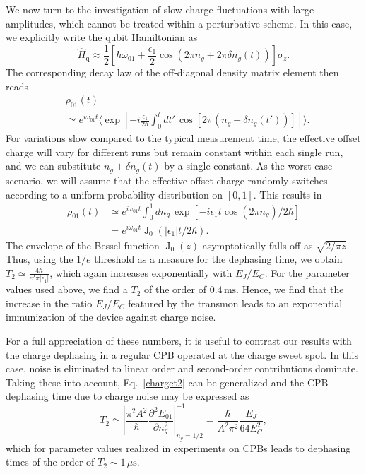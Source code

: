 \documentclass[twocolumn,amsmath,amssymb,floatfix,pra,showpacs,eqsecnum,footinbib,superscriptaddress]{revtex4}
\newcommand{\abs}[1]{\left|#1\right|}
\newcommand{\be}{\begin{equation}}
\newcommand{\ee}{\end{equation}}
\DeclareMathOperator{\bj}{J}
\begin{document}
We now turn to the investigation of slow charge fluctuations with large amplitudes, which cannot be treated within a perturbative scheme. In this case, we explicitly write the qubit Hamiltonian as
\be
\hat{H}_\text{q}\approx \frac{1}{2}\left[\hbar\omega_{01}+\frac{\epsilon_1}{2}\cos(2\pi n_g+ 2\pi \delta n_g(t))\right]\hat{\sigma}_z.
\ee
The corresponding decay law of the off-diagonal density matrix element then reads
\begin{align}
&\rho_{01}(t)\\\nonumber
&\simeq e^{i\omega_{01}t}\bigg\langle \exp\left[-i \frac{\epsilon_1}{2\hbar} \int_0^t dt'\,\cos[2\pi( n_g+ \delta n_g(t'))]\right]\bigg\rangle.
\end{align}
For variations slow compared to the typical measurement time, the effective offset charge will vary for different runs but remain constant within each single run, and we can substitute $n_g+\delta n_g(t)$ by a single constant. As the worst-case scenario, we will assume that the effective offset charge randomly switches according to a uniform probability distribution on $[0,1]$. This results in
\begin{align}
\rho_{01}(t)&\simeq e^{i\omega_{01}t}\int_0^1 dn_g\, \exp\left[-i \epsilon_1 t \cos(2\pi n_g)/2\hbar\right]\nonumber\\ &=e^{i\omega_{01}t}\bj_0(\abs{\epsilon_1}t/2\hbar)  .
\end{align}
The envelope of the Bessel function $\bj_0(z)$ asymptotically falls off as $\sqrt{2/\pi z}$. Thus, using the $1/e$ threshold as a measure for the dephasing time, we obtain $T_2\simeq\frac{4\hbar}{e^2\pi\abs{\epsilon_1}}$, which again increases exponentially with $E_J/E_C$. For the parameter values used above, we find a $T_2$ of the order of $0.4\,\text{ms}$. Hence, we find that the increase in the ratio $E_J/E_C$ featured by the transmon leads to an exponential immunization of the device against charge noise. 

For a full appreciation of these numbers, it is useful to contrast our results with the charge dephasing in a regular CPB operated at the charge sweet spot. In this case, noise is eliminated to linear order and second-order contributions dominate. Taking these into account, Eq.~\eqref{charget2} can be generalized and the CPB dephasing time due to charge noise may be expressed as \cite{ithier}
\be\label{2ndorder}
T_2\simeq \abs{ \frac{\pi^2A^2}{\hbar}\frac{\partial^2 E_{01}}{\partial n_g^2}}^{-1}_{n_g=1/2}=\frac{\hbar}{A^2\pi^2}\frac{E_J}{64E_C^2},
\ee
which for parameter values realized in experiments on CPBs \cite{vion2} leads to dephasing times of the order of $T_2\sim1\,\mu\text{s}$.
\end{document}
